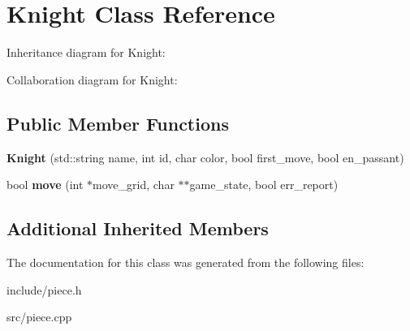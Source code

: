 \hypertarget{classKnight}{}\section{Knight Class Reference}
\label{classKnight}


Inheritance diagram for Knight\+:


Collaboration diagram for Knight\+:
\subsection*{Public Member Functions}
\begin{DoxyCompactItemize}
\item 
\mbox{\label{classKnight_aea4b7f8c88a457edbf5595d55825c92e}} 
{\bfseries Knight} (std\+::string name, int id, char color, bool first\+\_\+move, bool en\+\_\+passant)
\item 
\mbox{\label{classKnight_a9ebddc284fc0733965fb6c746f15aac5}} 
bool {\bfseries move} (int $\ast$move\+\_\+grid, char $\ast$$\ast$game\+\_\+state, bool err\+\_\+report)
\end{DoxyCompactItemize}
\subsection*{Additional Inherited Members}


The documentation for this class was generated from the following files\+:\begin{DoxyCompactItemize}
\item 
include/piece.\+h\item 
src/piece.\+cpp\end{DoxyCompactItemize}
